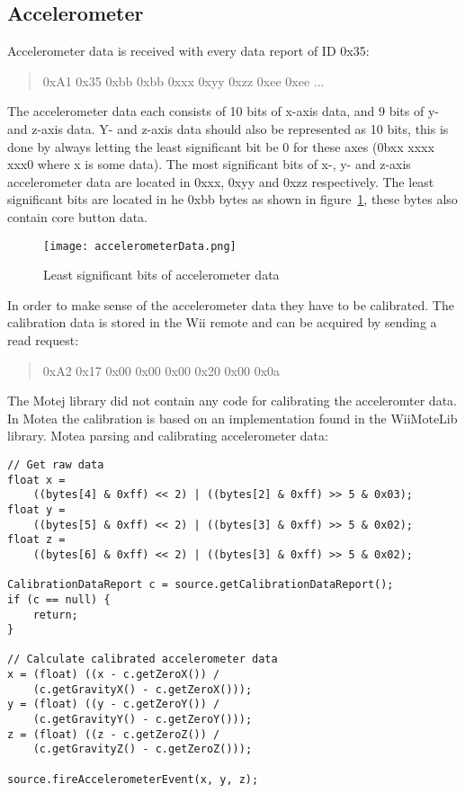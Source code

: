 \subsection{Accelerometer}
Accelerometer data is received with every data report of ID 0x35:
\begin{quote}
0xA1 0x35 0xbb 0xbb 0xxx 0xyy 0xzz 0xee 0xee ...
\end{quote}
The accelerometer data each consists of 10 bits of x-axis data, and 9 bits of y- and z-axis data. Y- and z-axis data should also be represented as 10 bits, this is done by always letting the least significant bit be 0 for these axes (0bxx xxxx xxx0 where x is some data). The most significant bits of x-, y- and z-axis accelerometer data are located in 0xxx, 0xyy and 0xzz respectively. The least significant bits are located in he 0xbb bytes as shown in figure~\ref{fig:accelerometerData}, these bytes also contain core button data.
\begin{figure}[h!]
\texttt{[image: accelerometerData.png]}
\caption{\footnotesize Least significant bits of accelerometer data}
\label{fig:accelerometerData}
\end{figure}

In order to make sense of the accelerometer data they have to be calibrated. The calibration data is stored in the Wii remote and can be acquired by sending a read request:
\begin{quote}
0xA2 0x17 0x00 0x00 0x00 0x20 0x00 0x0a
\end{quote}

The Motej \cite{Motej} library did not contain any code for calibrating the acceleromter data. In Motea the calibration is based on an implementation found in the WiiMoteLib \cite{wiiMoteLib} library. Motea parsing and calibrating accelerometer data:
\begin{lstlisting}
// Get raw data
float x = 
	((bytes[4] & 0xff) << 2) | ((bytes[2] & 0xff) >> 5 & 0x03);
float y = 
	((bytes[5] & 0xff) << 2) | ((bytes[3] & 0xff) >> 5 & 0x02);
float z = 
	((bytes[6] & 0xff) << 2) | ((bytes[3] & 0xff) >> 5 & 0x02);

CalibrationDataReport c = source.getCalibrationDataReport();
if (c == null) {
	return;
}

// Calculate calibrated accelerometer data
x = (float) ((x - c.getZeroX()) / 
	(c.getGravityX() - c.getZeroX()));
y = (float) ((y - c.getZeroY()) / 
	(c.getGravityY() - c.getZeroY()));
z = (float) ((z - c.getZeroZ())	/ 
	(c.getGravityZ() - c.getZeroZ()));

source.fireAccelerometerEvent(x, y, z);
\end{lstlisting}

